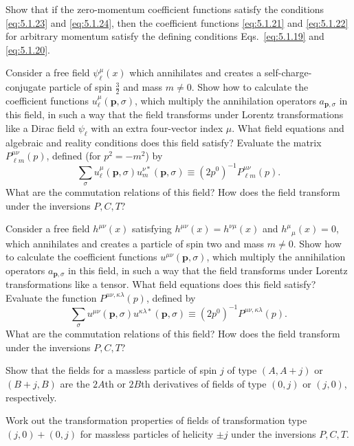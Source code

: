 
\begin{enumerate}
 Show that if the zero-momentum coefficient functions satisfy the
conditions \eqref{eq:5.1.23} and \eqref{eq:5.1.24}, then the coefficient functions \eqref{eq:5.1.21}
and \eqref{eq:5.1.22} for arbitrary momentum satisfy the defining conditions
Eqs.~\eqref{eq:5.1.19} and \eqref{eq:5.1.20}.

 Consider a free field $\psi_\ell^\mu(x)$ which annihilates and creates a
self-charge-conjugate particle of spin $\tfrac32$ and mass $m\ne0$. Show how
to calculate the coefficient functions $u_\ell^\mu(\mathbf p,\sigma)$, which
multiply the annihilation operators $a_{\mathbf p,\sigma}$ in this field, in
such a way that the field transforms under Lorentz transformations like a
Dirac field $\psi_\ell$ with an extra four-vector index $\mu$. What field
equations and algebraic and reality conditions does this field satisfy?
Evaluate the matrix $P_{\ell m}^{\mu\nu}(p)$, defined (for $p^2=-m^2$) by
\[
  \sum_\sigma u_\ell^\mu(\mathbf p,\sigma)
    u_m^{\nu *}(\mathbf p,\sigma)
  \equiv (2p^0)^{-1}P_{\ell m}^{\mu\nu}(p).
\]
What are the commutation relations of this field? How does the field
transform under the inversions $P,C,T$?

 Consider a free field $h^{\mu\nu}(x)$ satisfying
$h^{\mu\nu}(x)=h^{\nu\mu}(x)$ and $h^\mu{}_\mu(x)=0$, which annihilates and
creates a particle of spin two and mass $m\ne0$. Show how to calculate the
coefficient functions $u^{\mu\nu}(\mathbf p,\sigma)$, which multiply the
annihilation operators $a_{\mathbf p,\sigma}$ in this field, in such a way that
the field transforms under Lorentz transformations like a tensor. What field
equations does this field satisfy? Evaluate the function
$P^{\mu\nu,\kappa\lambda}(p)$, defined by
\[
  \sum_\sigma u^{\mu\nu}(\mathbf p,\sigma)
    u^{\kappa\lambda *}(\mathbf p,\sigma)
  \equiv (2p^0)^{-1}P^{\mu\nu,\kappa\lambda}(p).
\]
What are the commutation relations of this field? How does the field
transform under the inversions $P,C,T$?

 Show that the fields for a massless particle of spin $j$ of type
$(A,A+j)$ or $(B+j,B)$ are the $2A$th or $2B$th derivatives of fields of
type $(0,j)$ or $(j,0)$, respectively.

 Work out the transformation properties of fields of transformation
type $(j,0)+(0,j)$ for massless particles of helicity $\pm j$ under the
inversions $P,C,T$.


\end{enumerate}
